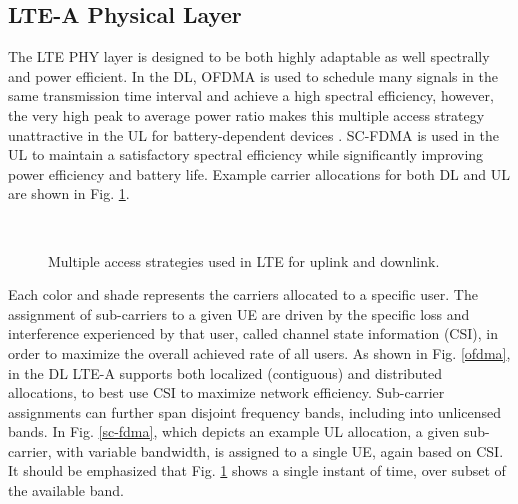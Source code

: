 \subsection{LTE-A Physical Layer}
\label{lte-phy}
The LTE PHY layer is designed to be both highly adaptable as well spectrally and power efficient.  In the DL, OFDMA is used to schedule many signals in the same transmission time interval and achieve a high spectral efficiency, however, the very high peak to average power ratio makes this multiple access strategy unattractive in the UL for battery-dependent devices \cite{tr36201}\cite{tr36211}.  SC-FDMA is used in the UL to maintain a satisfactory spectral efficiency while significantly improving power efficiency and battery life. Example carrier allocations for both DL and UL are shown in Fig. \ref{lte:of-sc-fdma}.
\begin{figure}[!ht] 	
	\\
	\caption{Multiple access strategies used in LTE for uplink and downlink.}
	\label{lte:of-sc-fdma}
\end{figure}
Each color and shade represents the carriers allocated to a specific user.  The assignment of sub-carriers to a given UE are driven by the specific loss and interference experienced by that user, called channel state information (CSI), in order to maximize the overall achieved rate of all users.  As shown in Fig. \ref{ofdma}, in the DL LTE-A supports both localized (contiguous) and distributed allocations, to best use CSI to maximize network efficiency. Sub-carrier assignments can further span disjoint frequency bands, including into unlicensed bands.  In Fig. \ref{sc-fdma}, which depicts an example UL allocation, a given sub-carrier, with variable bandwidth, is assigned to a single UE, again based on CSI.  It should be emphasized that Fig. \ref{lte:of-sc-fdma} shows a single instant of time, over subset of the available band. 

